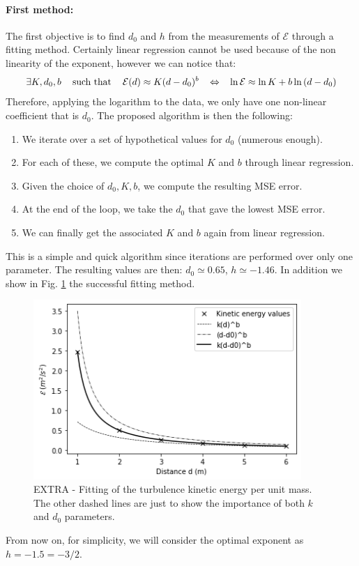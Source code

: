 \documentclass[11pt,titlepage]{article}
\begin{document}
\paragraph{First method:}
The first objective is to find $d_0$ and $h$ from the measurements of $\mathcal{E}$ through a fitting method. Certainly linear regression cannot be used because of the non linearity of the exponent, however we can notice that:
\begin{equation}\label{log_eq}
	\exists K, d_0, b \hspace{3mm} \text{ such that } \hspace{3mm} \mathcal{E}(d) \approx K(d-d_0)^b \hspace{3mm} \Leftrightarrow \hspace{3mm} \ln{\mathcal{E}} \approx \ln{K} + b \ln{(d-d_0)}
\end{equation}
Therefore, applying the logarithm to the data, we only have one non-linear coefficient that is $d_0$. The proposed algorithm is then the following: 
\begin{enumerate}
	\item We iterate over a set of hypothetical values for $d_0$ (numerous enough).
	\item For each of these, we compute the optimal $K$ and $b$ through linear regression.
	\item Given the choice of $d_0,K,b$, we compute the resulting MSE error.
	\item At the end of the loop, we take the $d_0$ that gave the lowest MSE error.
	\item We can finally get the associated $K$ and $b$ again from linear regression.
\end{enumerate}
	This is a simple and quick algorithm since iterations are performed over only one parameter. The resulting values are then: $d_0 \simeq 0.65$, $h \simeq -1.46$. In addition we show in Fig. \ref{fig5} the successful fitting method.
		\begin{center} 
		\begin{figure} [h]
			\centering
			\includegraphics[width = 4in]{./figures/ex1_5_1.png}
			\caption{EXTRA - Fitting of the turbulence kinetic energy per unit mass. The other dashed lines are just to show the importance of both $k$ and $d_0$ parameters.}
			\label{fig5}
		\end{figure}
	\end{center}
	 From now on,  for simplicity, we will consider the optimal exponent as $h=-1.5 = -3/2$. 
	
\end{document}
